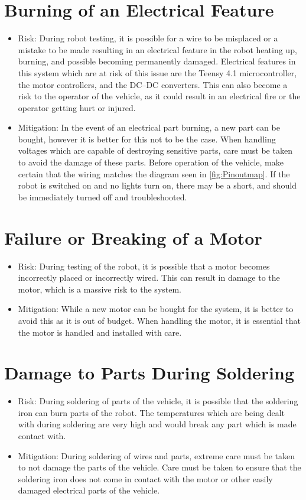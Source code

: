 \documentclass[11pt]{report}
\begin{document}
\section{Burning of an Electrical Feature}
\begin{itemize}
    \item Risk: During robot testing, it is possible for a wire to be misplaced or a mistake to be made resulting in an electrical feature in the robot heating up, burning, and possible becoming permanently damaged. Electrical features in this system which are at risk of this issue are the Teensy 4.1 microcontroller, the motor controllers, and the \gls{DC}--\gls{DC} converters. This can also become a risk to the operator of the vehicle, as it could result in an electrical fire or the operator getting hurt or injured.
    \item Mitigation: In the event of an electrical part burning, a new part can be bought, however it is better for this not to be the case. When handling voltages which are capable of destroying sensitive parts, care must be taken to avoid the damage of these parts. Before operation of the vehicle, make certain that the wiring matches the diagram seen in \cref{fig:Pinoutmap}. If the robot is switched on and no lights turn on, there may be a short, and should be immediately turned off and troubleshooted.
\end{itemize}
\section{Failure or Breaking of a Motor} 
\begin{itemize}
    \item Risk: During testing of the robot, it is possible that a motor becomes incorrectly placed or incorrectly wired. This can result in damage to the motor, which is a massive risk to the system.
    \item Mitigation: While a new motor can be bought for the system, it is better to avoid this as it is out of budget. When handling the motor, it is essential that the motor is handled and installed with care. 
\end{itemize}
\section{Damage to Parts During Soldering}
\begin{itemize}
    \item Risk: During soldering of parts of the vehicle, it is possible that the soldering iron can burn parts of the robot. The temperatures which are being dealt with during soldering are very high and would break any part which is made contact with. 
    \item Mitigation: During soldering of wires and parts, extreme care must be taken to not damage the parts of the vehicle. Care must be taken to ensure that the soldering iron does not come in contact with the motor or other easily damaged electrical parts of the vehicle.
\end{itemize}
\end{document}
